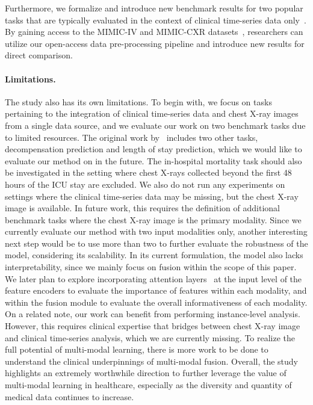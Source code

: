 \documentclass[pmlr]{jmlr}
\begin{document}
Furthermore, we formalize and introduce new benchmark results for two popular tasks that are typically evaluated in the context of clinical time-series data only~\citep{benchhmark}. By gaining access to the MIMIC-IV and MIMIC-CXR datasets~\citep{mimic4,mimiccxrjpg}, researchers can utilize our open-access data pre-processing pipeline and introduce new results for direct comparison.







\paragraph{Limitations.} The study also has its own limitations. To begin with, we focus on tasks pertaining to the integration of clinical time-series data and chest X-ray images from a single data source, and we evaluate our work on two benchmark tasks due to limited resources. The original work by~\cite{benchhmark} includes two other tasks, decompensation prediction and length of stay prediction, which we would like to evaluate our method on in the future. The in-hospital mortality task should also be investigated in the setting where chest X-rays collected beyond the first 48 hours of the ICU stay are excluded. We also do not run any experiments on settings where the clinical time-series data may be missing, but the chest X-ray image is available. In future work, this requires the definition of additional benchmark tasks where the chest X-ray image is the primary modality.  Since we currently evaluate our method with two input modalities only, another interesting next step would be to use more than two to further evaluate the robustness of the model, considering its scalability. In its current formulation, the model also lacks interpretability, since we mainly focus on fusion within the scope of this paper. We later plan to explore incorporating attention layers~\citep{vaswani2017attention} at the input level of the feature encoders to evaluate the importance of features within each modality, and within the fusion module to evaluate the overall informativeness of each modality. On a related note, our work can benefit from performing instance-level analysis. However, this requires clinical expertise that bridges between chest X-ray image and clinical time-series analysis, which we are currently missing. To realize the full potential of multi-modal learning, there is more work to be done to understand the clinical underpinnings of multi-modal fusion. Overall, the study highlights an extremely worthwhile direction to further leverage the value of multi-modal learning in healthcare, especially as the diversity and quantity of medical data continues to increase. 
\end{document}
